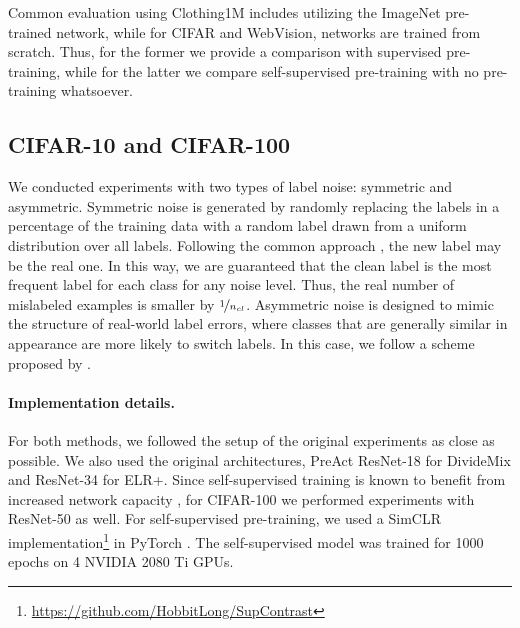 \documentclass[10pt,twocolumn,letterpaper]{article}
\renewcommand{\cite}[1]{\citep{#1}}
\begin{document}
Common evaluation using Clothing1M includes utilizing the ImageNet pre-trained network, while for CIFAR and WebVision, networks are trained from scratch. Thus, for the former we provide a comparison with supervised pre-training, while for the latter we compare self-supervised pre-training with no pre-training whatsoever.

\subsection{CIFAR-10 and CIFAR-100}
\label{subsec:cifar_exp}

We conducted experiments with two types of label noise: symmetric and asymmetric. 
Symmetric noise is generated by randomly replacing the
labels in a percentage of the training data with a random label drawn from a uniform distribution over all labels. 
Following the common approach \cite{zhang2016understanding,arazo2019mcorr,li2020dividemix}, the new label may be the real one. In this way, we are guaranteed that the clean label is the most frequent label for each class for any noise level. Thus, the real number of mislabeled examples is smaller by $\nicefrac{1}{n_{cl}}$. 
Asymmetric noise is designed to mimic the structure of real-world label errors, where classes that are generally similar in appearance are more likely to switch labels. In this case, we follow a scheme proposed by \citet{patrini2017making}. 

\paragraph{Implementation details.}
For both methods, we followed the setup of the original experiments as close as possible. We also used the original architectures,   PreAct ResNet-18 \cite{he2015deep} for DivideMix and ResNet-34 for ELR+. Since self-supervised training is known to benefit from increased network capacity \cite{henaff2019cpc2, chen2020simclr}, for CIFAR-100 we performed experiments with ResNet-50 as well.
For self-supervised pre-training, we used a SimCLR implementation\footnote{\url{https://github.com/HobbitLong/SupContrast}} in PyTorch \cite{paszke2019pytorch}. The self-supervised model was trained for 1000 epochs on 4 NVIDIA 2080 Ti GPUs.
\end{document}
